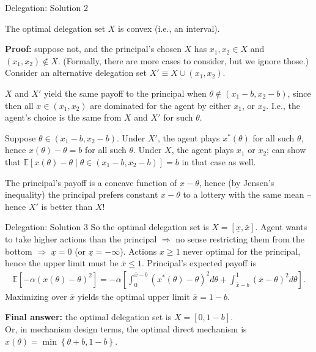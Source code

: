 \documentclass[english,10pt
,aspectratio=169
]{beamer}
\begin{document}
\begin{frame}{Delegation: Solution 2}
	\begin{lemma}
		The optimal delegation set $X$ is convex (i.e., an interval).
	\end{lemma}
	\textbf{Proof:} suppose not, and the principal's chosen $X$ has $x_1,x_2 \in X$ and $(x_1,x_2) \notin X$. (Formally, there are more cases to consider, but we ignore those.)
	Consider an alternative delegation set $X' \equiv X \cup (x_1, x_2)$.
	
	$X$ and $X'$ yield the same payoff to the principal when $\theta \notin (x_1-b, x_2-b)$, since then all $x \in (x_1, x_2)$ are dominated for the agent by either $x_1$, or $x_2$. I.e., the agent's choice is the same from $X$ and $X'$ for such $\theta$.
	
	Suppose $\theta \in (x_1-b, x_2-b)$. Under $X'$, the agent plays $x^*(\theta)$ for all such $\theta$, hence $x(\theta)-\theta = b$ for all such $\theta$.
	Under $X$, the agent plays $x_1$ or $x_2$; can show that $\mathbb{E} \left[ x(\theta)-\theta \mid \theta \in (x_1-b, x_2-b) \right] = b$ in that case as well.
	
	The principal's payoff is a concave function of $x-\theta$, hence (by Jensen's inequality) the principal prefers constant $x-\theta$ to a lottery with the same mean -- hence $X'$ is better than $X$!
\end{frame}


\begin{frame}{Delegation: Solution 3}
	So the optimal delegation set is $X = [\underline{x}, \bar{x}]$. Agent wants to take higher actions than the principal $\Rightarrow$ no sense restricting them from the bottom $\Rightarrow$ $\underline{x}=0$ (or $\underline{x}=-\infty$). Actions $x \geq 1$ never optimal for the principal, hence the upper limit must be $\bar{x} \leq 1$. Principal's expected payoff is
	\begin{align*}
		\mathbb{E}\left[-\alpha \left( x(\theta) - \theta \right)^2 \right]
		= -\alpha \left[ \int_0^{\bar{x}-b} \left(x^*(\theta)-\theta \right)^2 d\theta + \int_{\bar{x}-b}^{1} (\bar{x}-\theta)^2 d\theta \right].
	\end{align*}
	Maximizing over $\bar{x}$ yields the optimal upper limit $\bar{x} = 1-b$.
	
	\textbf{Final answer:} the optimal delegation set is $X = [0, 1-b]$. \\
	Or, in mechanism design terms, the optimal direct mechanism is $x(\theta) = \min \left\{ \theta+b, 1-b \right\}$.
\end{frame}
\end{document}
